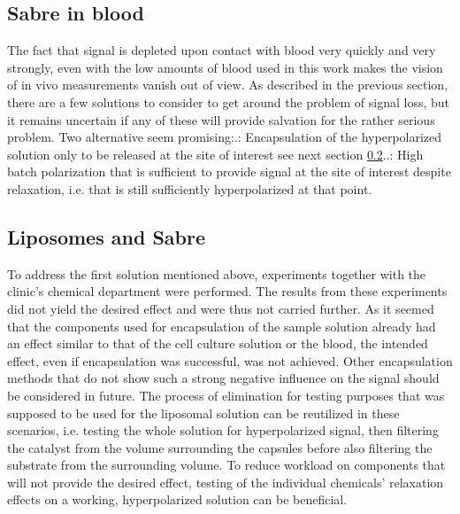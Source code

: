         \subsection{Sabre in blood}
        The fact that signal is depleted upon contact with blood very quickly and very strongly, even with the low amounts of blood used in this work makes the vision of in vivo measurements vanish out of view. As described in the previous section, there are a few solutions to consider to get around the problem of signal loss, but it remains uncertain if any of these will provide salvation for the rather serious problem. Two alternative seem promising:.: Encapsulation of the hyperpolarized solution only to be released at the site of interest see next section \ref{dc:subsec:liposomes}..: High batch polarization that is sufficient to provide signal at the site of interest despite relaxation, i.e. that is still sufficiently hyperpolarized at that point.
        \subsection{Liposomes and Sabre}
        \label{dc:subsec:liposomes}
        To address the first solution mentioned above, experiments together with the clinic's chemical department were performed. The results from these experiments did not yield the desired effect and were thus not carried further. As it seemed that the components used for encapsulation of the sample solution already had an effect similar to that of the cell culture solution or the blood, the intended effect, even if encapsulation was successful, was not achieved. Other encapsulation methods that do not show such a strong negative influence on the signal should be considered in future. The process of elimination for testing purposes that was supposed to be used for the liposomal solution can be reutilized in these scenarios, i.e. testing the whole solution for hyperpolarized signal, then filtering the catalyst from the volume surrounding the capsules before also filtering the substrate from the surrounding volume. To reduce workload on components that will not provide the desired effect, testing of the individual chemicals' relaxation effects on a working, hyperpolarized solution can be beneficial.

